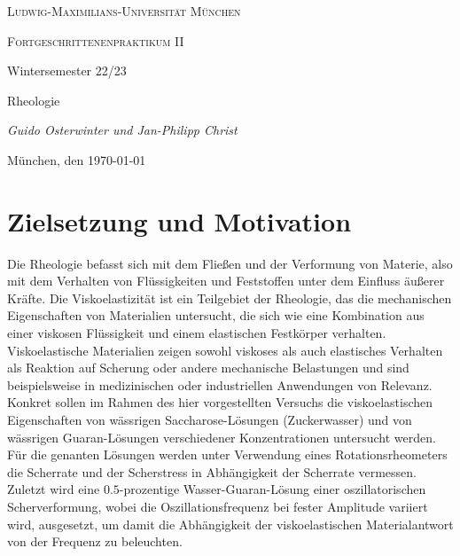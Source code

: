\documentclass[11pt,a4paper,oneside]{scrartcl}
\begin{document}
\begin{titlepage}
	\centering
	{\scshape\LARGE Ludwig-Maximilians-Universität \linebreak München \par}
	\vspace{1cm}
	{\scshape\Large Fortgeschrittenenpraktikum II \par Wintersemester 22/23 \par}
	\vspace{1.5cm}
	{\huge\bfseries \par  Rheologie\par}
	\vspace{2cm}
	{\Large\itshape Guido Osterwinter und Jan-Philipp Christ \par}
	\vfill
	{\large München, den \today\par}
\end{titlepage}

\tableofcontents
\newpage
\section{Zielsetzung und Motivation}

Die Rheologie befasst sich mit dem Fließen und der Verformung von Materie, also mit dem Verhalten von Flüssigkeiten und Feststoffen unter dem Einfluss äußerer Kräfte. Die Viskoelastizität ist ein Teilgebiet der Rheologie, das die mechanischen Eigenschaften von Materialien untersucht, die sich wie eine Kombination aus einer viskosen Flüssigkeit und einem elastischen Festkörper verhalten. Viskoelastische Materialien zeigen sowohl viskoses als auch elastisches Verhalten als Reaktion auf Scherung oder andere mechanische Belastungen und sind beispielsweise in medizinischen oder industriellen Anwendungen von Relevanz.\\
Konkret sollen im Rahmen des hier vorgestellten Versuchs die viskoelastischen Eigenschaften von wässrigen Saccharose-Lösungen (Zuckerwasser) und von wässrigen Guaran-Lösungen verschiedener Konzentrationen untersucht werden. Für die genanten Lösungen werden unter Verwendung eines Rotationsrheometers die Scherrate und der Scherstress  in Abhängigkeit der Scherrate vermessen.\\
Zuletzt wird eine $0.5$-prozentige Wasser-Guaran-Lösung einer oszillatorischen Scherverformung, wobei die Oszillationsfrequenz bei fester Amplitude variiert wird, ausgesetzt, um damit die Abhängigkeit der viskoelastischen Materialantwort  von der Frequenz zu beleuchten.
\end{document}
